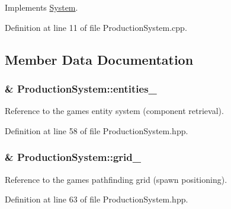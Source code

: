 Implements \hyperlink{class_system_a6d54c9bd38eb43d620a1451cb0925472}{System}.



Definition at line 11 of file Production\+System.\+cpp.



\subsection{Member Data Documentation}
\subsubsection[{\texorpdfstring{entities\+\_\+}{entities_}}]{\& Production\+System\+::entities\+\_\+\hspace{0.3cm}{\ttfamily [private]}}\hypertarget{class_production_system_a1635990974ff715fd1ac2035f9760e51}{}\label{class_production_system_a1635990974ff715fd1ac2035f9760e51}


Reference to the game\textquotesingle{}s entity system (component retrieval). 



Definition at line 58 of file Production\+System.\+hpp.

\subsubsection[{\texorpdfstring{grid\+\_\+}{grid_}}]{\& Production\+System\+::grid\+\_\+\hspace{0.3cm}{\ttfamily [private]}}\hypertarget{class_production_system_a7b57e417c67f4629e5b858b3f55edbf4}{}\label{class_production_system_a7b57e417c67f4629e5b858b3f55edbf4}


Reference to the game\textquotesingle{}s pathfinding grid (spawn positioning). 



Definition at line 63 of file Production\+System.\+hpp.

